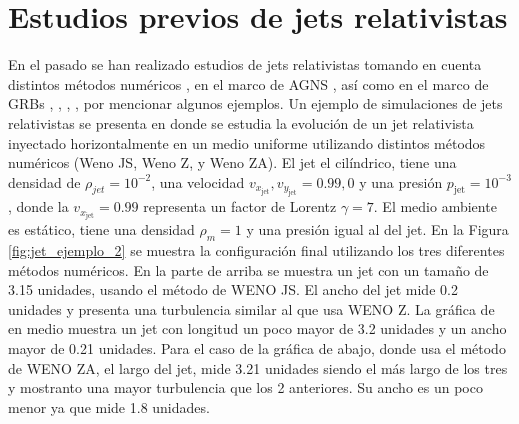\documentclass[12pt,a4paper]{book}
\begin{document}
  
  
\section{Estudios previos de jets relativistas}

En el pasado se han realizado estudios de jets relativistas tomando en cuenta distintos métodos numéricos \cite{SURJ-I, MB-HLLC-I}, en el marco de AGNS \cite{2011ApJ...743...42P}, así como en el marco de GRBs 
\cite{2013ApJ...767...19L}, \cite{2018PhRvL.120x1103L}, \cite{2021MNRAS.500.3511G}, \cite{2012ApJ...751...57D},
por mencionar algunos ejemplos. Un ejemplo de simulaciones de jets relativistas se presenta en \cite{SURJ-I} donde se estudia la evolución de un jet relativista inyectado horizontalmente en un medio uniforme utilizando distintos métodos numéricos (Weno JS, Weno Z, y Weno ZA). El jet el cilíndrico, tiene una densidad de $\rho_{jet} = 10^{-2}$, una velocidad $v_{x_{\text{jet}}},v_{y_{\text{jet}}} = 0.99, 0$ y 
una presión $p_{\text{jet}} = 10^{-3}$, donde la $v_{x_{\text{jet}}} = 0.99$ representa un factor de Lorentz $\gamma = 7$. El medio ambiente es estático, tiene una densidad $\rho_m = 1$ y una presión igual al del jet. 
En la Figura \ref{fig:jet_ejemplo_2} se muestra la configuración final utilizando los tres diferentes métodos numéricos.{\color{blue} En la parte  de arriba se muestra un jet con un tamaño de 3.15 unidades, usando el método de WENO JS. El ancho del jet mide 0.2 unidades y presenta una turbulencia similar al que usa WENO Z.
La gráfica de en medio muestra un jet con longitud un poco mayor de 3.2 unidades y un ancho mayor de 0.21 unidades. Para el caso de la gráfica de abajo, donde usa el método de WENO ZA, el largo del jet, mide 3.21 unidades
siendo el más largo de los tres  y mostranto una mayor turbulencia que los 2 anteriores. Su ancho es un poco menor ya que mide 1.8 unidades. }
\end{document}

